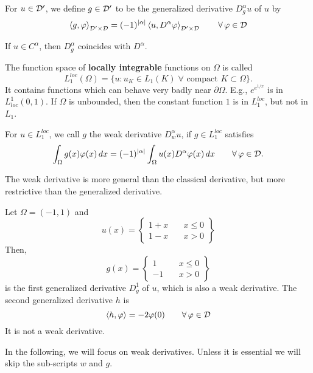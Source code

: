 \begin{definition} For $u \in {\cal D}^\prime$, we define 
$g \in {\cal D}^\prime$ to be the generalized 
derivative $D_g^\alpha u$ of $u$ by
$$
\left<g, \varphi \right>_{{\cal D}^\prime \times {\cal D}} = 
(-1)^{|\alpha|} \left<u, D^\alpha \varphi \right>_{{\cal D}^\prime \times {\cal D}}  \qquad \forall \, \varphi \in {\cal D}
$$
\end{definition}
%
\noindent
If $u \in C^\alpha$, then $D_g^\alpha$ coincides with $D^\alpha$. 

\noindent
The function space of {\bf locally integrable} functions on $\Omega$ 
is called
$$
L_1^{loc} (\Omega) = \{ u : u_K \in L_1(K) \; \forall \mbox{ compact } K 
\subset \Omega \}.
$$
It contains functions which can behave very badly near $\partial \Omega$.
E.g., $e^{e^{1/x}}$ is in $L_{loc}^1 (0,1)$. If $\Omega$ is unbounded, then
the constant function $1$ is in $L_1^{loc}$, but not in $L_1$.


\begin{definition} For $u \in L_1^{loc}$, we call $g$ the weak derivative
$D_w^\alpha u$, if $g \in L_1^{loc}$ satisfies
$$
\int_\Omega g(x) \varphi(x) \, dx =
(-1)^{|\alpha|} \int_\Omega u(x) D^\alpha \varphi (x) \, dx  \qquad \forall \, \varphi \in {\cal D}.
$$
\end{definition}
The weak derivative is more general than the classical derivative, but more
restrictive than the generalized derivative.


\begin{example} 
Let $\Omega = (-1,1)$ and 
$$
u(x) = \left\{ 
        \begin{array}{cl}
        1+x & \quad x \leq 0 \\
        1-x & \quad x > 0
        \end{array}
        \right\}
$$
Then, 
$$
g(x) = \left\{ 
        \begin{array}{cl}
        1 & \quad x \leq 0 \\
        -1 & \quad x > 0
        \end{array}
        \right\}
$$
is the first generalized derivative $D^1_g$ of $u$, which is also
a weak derivative. The second generalized derivative $h$ is 
$$
\left< h, \varphi \right> = -2 \varphi(0)  \qquad \forall \, \varphi \in {\cal D}
$$
It is not a weak derivative.
\end{example}

In the following, we will focus on weak derivatives. Unless it is essential
we will skip the sub-scripts $w$ and $g$.


